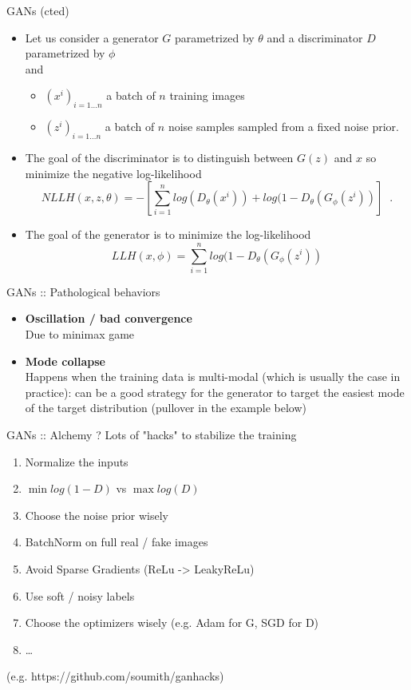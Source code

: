 \documentclass{beamer}
\begin{document}
\begin{frame}{GANs (cted)}
    \begin{itemize}
        \item Let us consider a generator $G$ parametrized by $\theta$ and a discriminator $D$ parametrized by $\phi$\\
        and
            \begin{itemize}
                \item $(x^i)_{i=1\dots n}$ a batch of $n$ training images
                \item $(z^i)_{i=1\dots n}$ a batch of $n$ noise samples sampled from a fixed noise prior.
            \end{itemize}
        \item The goal of the discriminator is to distinguish between $G(z)$ and $x$ so \textcolor{cOrange}{minimize} the negative log-likelihood
        \textcolor{cOrange}{\[ NLLH(x,z, \theta) = -\left[ \sum_{i=1}^n log(D_\theta(x^i)) + log(1-D_\theta(G_\phi(z^i)) \right] \;\;. \]}
        \item The goal of the generator is to \textcolor{cBlue}{minimize} the log-likelihood
        \textcolor{cBlue}{\[ LLH(x,\phi) = \sum_{i=1}^n log(1-D_\theta(G_\phi(z^i)) \]}
    \end{itemize}
\end{frame}

\begin{frame}{GANs :: Pathological behaviors}
\begin{itemize}
    \item \textbf{Oscillation / bad convergence}~\\
    Due to minimax game
    \item \textbf{Mode collapse}~\\
    Happens when the training data is multi-modal (which is usually the case in practice): can be a good strategy for the generator to target the easiest mode of the target distribution (pullover in the example below)
\end{itemize}
\end{frame}

\begin{frame}{GANs :: Alchemy ?}
Lots of "hacks" to stabilize the training
    \begin{enumerate}
        \item Normalize the inputs
        \item $\mathop{min} log(1-D)$ vs $\mathop{max} log(D)$
        \item Choose the noise prior wisely
        \item BatchNorm on full real / fake images
        \item Avoid Sparse Gradients (ReLu -> LeakyReLu)
        \item Use soft / noisy labels
        \item Choose the optimizers wisely (e.g. Adam for G, SGD for D)
        \item \dots
    \end{enumerate}
    (e.g. https://github.com/soumith/ganhacks)
\end{frame}
\end{document}
